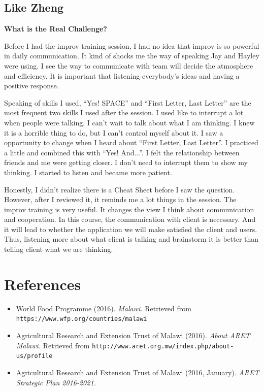 \documentclass[12pt,letterpaper]{article}
\begin{document}
\subsection{Like Zheng}
\textbf{What is the Real Challenge?}\par
Before I had the improv training session, I had no idea that improv is so powerful in daily communication. It kind of shocks me the way of speaking Jay and Hayley were using. I see the way to communicate with team will decide the atmosphere and efficiency. It is important that listening everybody’s ideas and having a positive response.\par
Speaking of skills I used, “Yes! SPACE” and “First Letter, Last Letter” are the most frequent two skills I used after the session. I used like to interrupt a lot when people were talking. I can’t wait to talk about what I am thinking. I knew it is a horrible thing to do, but I can’t control myself about it. I saw a opportunity to change when I heard about “First Letter, Last Letter”. I practiced a little and combined this with “Yes! And...”. I felt the relationship between friends and me were getting closer. I don’t need to interrupt them to show my thinking. I started to listen and became more patient.\par
Honestly, I didn’t realize there is a Cheat Sheet before I saw the question. However, after I reviewed it, it reminds me a lot things in the session. The improv training is very useful. It changes the view I think about communication and cooperation. In this course, the communication with client is necessary. And it will lead to whether the application we will make satisfied the client and users. Thus, listening more about what client is talking and brainstorm it is better than telling client what we are thinking.






\clearpage
\section{References}
\begin{flushleft}
\begin{itemize}[leftmargin=12pt]

\item World Food Programme (2016). \emph{Malawi.}
 Retrieved from \texttt{https://www.wfp.org/countries/malawi}

\item Agricultural Research and Extension Trust of Malawi (2016). \emph{About ARET Malawi.}
Retrieved from \texttt{http://www.aret.org.mw/index.php/about-us/profile}

\item Agricultural Research and Extension Trust of Malawi (2016, January). \emph{ARET Strategic Plan 2016-2021.}


\end{itemize}
\end{flushleft}   
\end{document}
